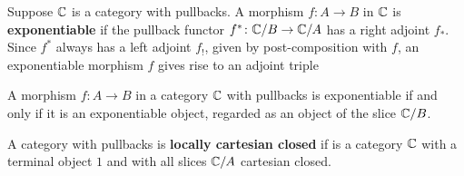 \begin{definition}
  \label{defn:exponentiable-morphism}
   \leanok
    Suppose $\mathbb{C}$ is a category with pullbacks.
    A morphism $f \colon A \to B$ in $\mathbb{C}$ is \textbf{exponentiable} if the pullback functor
    $f^* \colon \mathbb{C} / B \to \mathbb{C} / A$ has a right adjoint $f_*$.
    Since $f^*$ always has a left adjoint $f_!$, given by post-composition with $f$, an
    exponentiable morphism $f$ gives rise to an adjoint triple
    \begin{center}\end{center}
\end{definition}


\begin{theorem}
  \label{thm:exponentiable-mor-exponentiable-obj}
  \leanok
  A morphism $f \colon A \to B$ in a category $\mathbb{C}$ with pullbacks is exponentiable if and only if
  it is an exponentiable object, regarded as an object of the slice $\mathbb{C} / B$.
\end{theorem}


\begin{definition}
\label{defn:LCCC}
 \leanok
  A category with pullbacks is \textbf{locally cartesian closed} if
  is a category $\mathbb{C}$ with a terminal object $1$ and with all slices $\mathbb{C} / A$ cartesian closed.
\end{definition}
